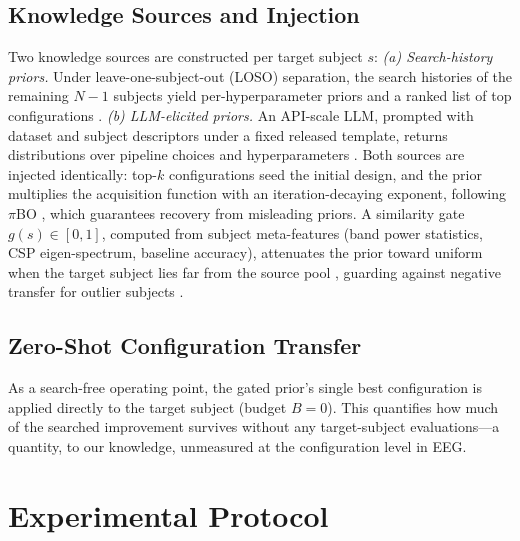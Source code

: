 \documentclass[conference]{IEEEtran}
\begin{document}
\subsection{Knowledge Sources and Injection}
Two knowledge sources are constructed per target subject $s$:
\emph{(a) Search-history priors.} Under leave-one-subject-out (LOSO) separation, the search histories of the remaining $N{-}1$ subjects yield per-hyperparameter priors and a ranked list of top configurations \cite{FeurerEtAl2015, BaiEtAl2023}.
\emph{(b) LLM-elicited priors.} An API-scale LLM, prompted with dataset and subject descriptors under a fixed released template, returns distributions over pipeline choices and hyperparameters \cite{LiuEtAl2024}.
Both sources are injected identically: top-$k$ configurations seed the initial design, and the prior multiplies the acquisition function with an iteration-decaying exponent, following $\pi$BO \cite{HvarfnerEtAl2022}, which guarantees recovery from misleading priors. A similarity gate $g(s)\in[0,1]$, computed from subject meta-features (band power statistics, CSP eigen-spectrum, baseline accuracy), attenuates the prior toward uniform when the target subject lies far from the source pool \cite{NomuraEtAl2021}, guarding against negative transfer for outlier subjects \cite{ZhangEtAl2024, HvarfnerEtAl2026}.

\subsection{Zero-Shot Configuration Transfer}
As a search-free operating point, the gated prior's single best configuration is applied directly to the target subject (budget $B{=}0$). This quantifies how much of the searched improvement survives without any target-subject evaluations---a quantity, to our knowledge, unmeasured at the configuration level in EEG.


\section{Experimental Protocol}
\label{sec:experiment}
\end{document}
